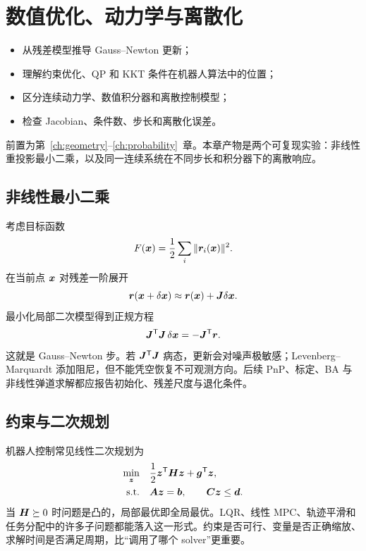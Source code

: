 \chapter{数值优化、动力学与离散化}
\label{ch:optimization-dynamics}

\begin{learningobjectives}
\begin{itemize}
  \item 从残差模型推导 Gauss--Newton 更新；
  \item 理解约束优化、QP 和 KKT 条件在机器人算法中的位置；
  \item 区分连续动力学、数值积分器和离散控制模型；
  \item 检查 Jacobian、条件数、步长和离散化误差。
\end{itemize}
\end{learningobjectives}

\begin{prerequisites}
前置为第~\ref{ch:geometry}--\ref{ch:probability}~章。本章产物是两个可复现实验：非线性重投影最小二乘，以及同一连续系统在不同步长和积分器下的离散响应。
\end{prerequisites}

\section{非线性最小二乘}

考虑目标函数
\begin{equation}
  F(\bm{x})=\frac{1}{2}\sum_i \|\bm{r}_i(\bm{x})\|^2.
\end{equation}
在当前点 $\bm{x}$ 对残差一阶展开
\begin{equation}
  \bm{r}(\bm{x}+\delta\bm{x})
  \approx \bm{r}(\bm{x})+\bm{J}\delta\bm{x}.
\end{equation}
最小化局部二次模型得到正规方程
\begin{equation}
  \bm{J}^{\mathsf T}\bm{J}\,\delta\bm{x}
  =-\bm{J}^{\mathsf T}\bm{r}.
\end{equation}
这就是 Gauss--Newton 步。若 $\bm{J}^{\mathsf T}\bm{J}$ 病态，更新会对噪声极敏感；Levenberg--Marquardt 添加阻尼，但不能凭空恢复不可观测方向。后续 PnP、标定、BA 与非线性弹道求解都应报告初始化、残差尺度与退化条件。

\section{约束与二次规划}

机器人控制常见线性二次规划为
\begin{align}
  \min_{\bm{z}}\quad &\frac{1}{2}\bm{z}^{\mathsf T}\bm{H}\bm{z}+\bm{g}^{\mathsf T}\bm{z},\\
  \text{s.t.}\quad &\bm{A}\bm{z}=\bm{b},\qquad
  \bm{C}\bm{z}\le \bm{d}.
\end{align}
当 $\bm{H}\succeq0$ 时问题是凸的，局部最优即全局最优。LQR、线性 MPC、轨迹平滑和任务分配中的许多子问题都能落入这一形式。约束是否可行、变量是否正确缩放、求解时间是否满足周期，比“调用了哪个 solver”更重要。

